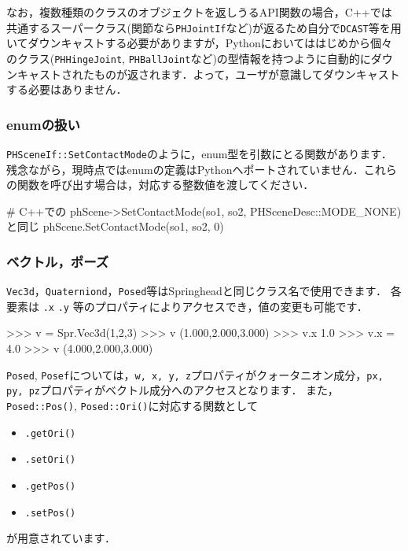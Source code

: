 \KLUDGE なお，複数種類のクラスのオブジェクトを返しうるAPI関数の場合，C++では共通するスーパークラス(関節なら\texttt{PHJointIf}など)が返るため自分で\texttt{DCAST}等を用いてダウンキャストする必要がありますが，Pythonにおいてははじめから個々のクラス(\texttt{PHHingeJoint}, \texttt{PHBallJoint}など)の型情報を持つように自動的にダウンキャストされたものが返されます．よって，ユーザが意識してダウンキャストする必要はありません．


\KLUDGE %
\KLUDGE %
\subsubsection*{enumの扱い}

\texttt{PHSceneIf::SetContactMode}のように，enum型を引数にとる関数があります．
\KLUDGE 残念ながら，現時点ではenumの定義はPythonへポートされていません．これらの関数を呼び出す場合は，対応する整数値を渡してください．
\begin{sourcecode}
# C++での phScene->SetContactMode(so1, so2, PHSceneDesc::MODE_NONE) と同じ
phScene.SetContactMode(so1, so2, 0)
\end{sourcecode}


\KLUDGE %
\KLUDGE %
\subsubsection*{ベクトル，ポーズ}

\texttt{Vec3d}，\texttt{Quaterniond}，\texttt{Posed}等はSpringheadと同じクラス名で使用できます．
\KLUDGE 各要素は \texttt{.x} \texttt{.y} 等のプロパティによりアクセスでき，値の変更も可能です．

\begin{sourcecode}
\KLUDGE >>> v = Spr.Vec3d(1,2,3)
\KLUDGE >>> v
(1.000,2.000,3.000)
\KLUDGE >>> v.x
1.0
\KLUDGE >>> v.x = 4.0
\KLUDGE >>> v
(4.000,2.000,3.000)
\end{sourcecode}

\texttt{Posed}, \texttt{Posef}については，\texttt{w, x, y, z}プロパティがクォータニオン成分，\texttt{px, py, pz}プロパティがベクトル成分へのアクセスとなります．
\KLUDGE また，\texttt{Posed::Pos()}, \texttt{Posed::Ori()}に対応する関数として
\begin{itemize}
\item \texttt{.getOri()}
\item \texttt{.setOri()}
\item \texttt{.getPos()}
\item \texttt{.setPos()}
\end{itemize}
\KLUDGE が用意されています．



